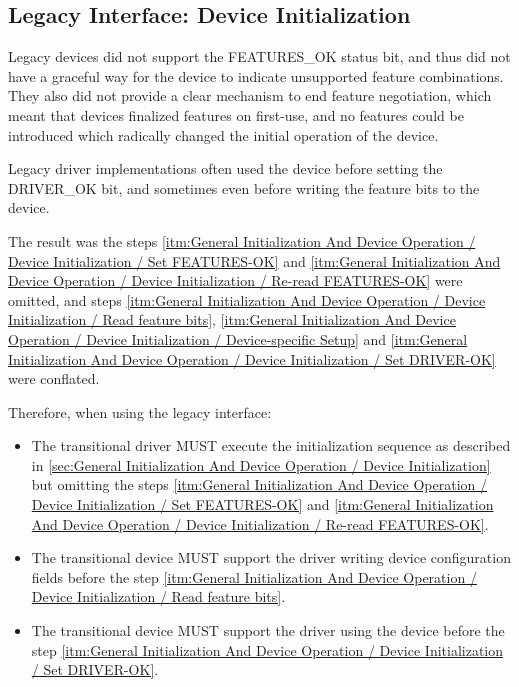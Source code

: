 \subsection{Legacy Interface: Device Initialization}\label{sec:General Initialization And Device Operation / Device Initialization / Legacy Interface: Device Initialization}
Legacy devices did not support the FEATURES_OK status bit, and thus did
not have a graceful way for the device to indicate unsupported feature
combinations.  They also did not provide a clear mechanism to end
feature negotiation, which meant that devices finalized features on
first-use, and no features could be introduced which radically changed
the initial operation of the device.

Legacy driver implementations often used the device before setting the
DRIVER_OK bit, and sometimes even before writing the feature bits
to the device.

The result was the steps \ref{itm:General Initialization And
Device Operation / Device Initialization / Set FEATURES-OK} and
\ref{itm:General Initialization And Device Operation / Device
Initialization / Re-read FEATURES-OK} were omitted, and steps
\ref{itm:General Initialization And Device Operation /
Device Initialization / Read feature bits},
\ref{itm:General Initialization And Device Operation / Device Initialization / Device-specific Setup} and \ref{itm:General Initialization And Device Operation / Device Initialization / Set DRIVER-OK}
were conflated.

Therefore, when using the legacy interface:
\begin{itemize}
\item
The transitional driver MUST execute the initialization
sequence as described in \ref{sec:General Initialization And Device
Operation / Device Initialization}
but omitting the steps \ref{itm:General Initialization And Device
Operation / Device Initialization / Set FEATURES-OK} and
\ref{itm:General Initialization And Device Operation / Device
Initialization / Re-read FEATURES-OK}.

\item
The transitional device MUST support the driver
writing device configuration fields
before the step \ref{itm:General Initialization And Device Operation /
Device Initialization / Read feature bits}.
\item
The transitional device MUST support the driver
using the device before the step \ref{itm:General Initialization
And Device Operation / Device Initialization / Set DRIVER-OK}.
\end{itemize}

